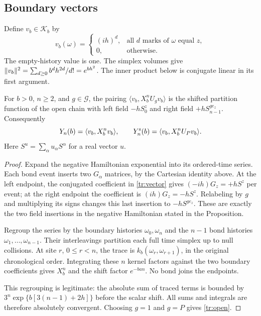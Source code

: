 \subsection{Boundary vectors}
Define $v_b\in\mathcal K_b$ by
\begin{equation}\label{tr:vector}
 v_b(\omega)=
 \begin{cases}
 (ih)^d,&\text{all $d$ marks of $\omega$ equal $z$},\\
 0,&\text{otherwise}.
 \end{cases}
\end{equation}
The empty-history value is one. The simplex volumes give
$\lVert v_b\rVert^2=\sum_{d\ge0}b^dh^{2d}/d!=e^{bh^2}$.
The inner product below is conjugate linear in its first argument.

\begin{proposition}\label{tr:boundary}
For $b>0$, $n\ge2$, and $g\in\mathcal G$, the pairing
$\langle v_b,X_b^nU_gv_b\rangle$ is the shifted partition function
of the open chain with left field $-hS_0^z$ and right field
$+hS_{n-1}^{ge_z}$. Consequently
\begin{equation}\label{tr:open}
 Y_n(b)=\langle v_b,X_b^nv_b\rangle,\qquad
 Y_n^{\rm s}(b)=\langle v_b,X_b^nU_Pv_b\rangle.
\end{equation}
Here $S^u=\sum_\alpha u_\alpha S^\alpha$ for a real vector $u$.
\end{proposition}
\begin{proof}
Expand the negative Hamiltonian exponential into its ordered-time
series. Each bond event inserts two $G_\alpha$ matrices, by the
Cartesian identity above. At the left endpoint, the conjugated
coefficient in \eqref{tr:vector} gives
$(-ih)G_z=+hS^z$ per event; at the right endpoint the coefficient is
$(ih)G_z=-hS^z$. Relabeling by $g$ and multiplying its signs changes
this last insertion to $-hS^{ge_z}$. These are exactly the two field
insertions in the negative Hamiltonian stated in the Proposition.

Regroup the series by the boundary histories $\omega_0,\omega_n$
and the $n-1$ bond histories $\omega_1,\ldots,\omega_{n-1}$.
Their interleavings partition each full time simplex up to null
collisions. At site $r$, $0\le r<n$, the trace is
$k_b(\omega_r,\omega_{r+1})$, in the original chronological order.
Integrating these $n$ kernel factors against the two boundary
coefficients gives $X_b^n$ and the shift factor $e^{-ban}$.
No bond joins the endpoints.

This regrouping is legitimate: the absolute sum of traced terms is
bounded by
$3^n\exp\{b[3(n-1)+2h]\}$ before the scalar shift. All sums and
integrals are therefore absolutely convergent. Choosing $g=1$ and
$g=P$ gives \eqref{tr:open}.
\end{proof}

